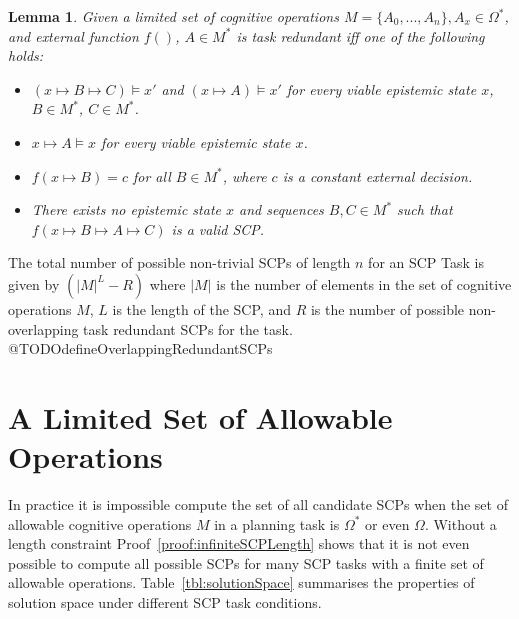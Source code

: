 \documentclass[
11pt, %
english, %
singlespacing, %
headsepline, %
]{MastersDoctoralThesis} %
\newtheorem{lemma}{Lemma}
\begin{document}
\begin{lemma} \label{lem:taskredundant}
Given a limited set of cognitive operations $M=\{A_0, ..., A_n\}, A_x \in \Omega^*$, and external function $f()$, $A \in M^*$ is task redundant iff one of the following holds:
\begin{itemize}
\item $(x \longmapsto B \longmapsto C) \models x'$ and $(x \longmapsto A) \models x'$ for every viable epistemic state $x$, $B \in M^*$, $C \in M^*$. 
\item $x \longmapsto A \models x$ for every viable epistemic state $x$.
\item $f(x \longmapsto B)=c$ for all $B \in M^*$, where $c$ is a constant external decision.
\item There exists no epistemic state $x$ and sequences $B, C \in M^*$ such that $f(x \longmapsto B \longmapsto A \longmapsto C)$ is a valid SCP.
\end{itemize}
\end{lemma}

The total number of possible non-trivial SCPs of length $n$ for an SCP Task is given by $(|M|^L - R)$ where $|M|$ is the number of elements in the set of cognitive operations $M$, $L$ is the length of the SCP, and $R$ is the number of possible non-overlapping task redundant SCPs for the task. @TODOdefineOverlappingRedundantSCPs


\section{A Limited Set of Allowable Operations}
In practice it is impossible compute the set of all candidate SCPs when the set of allowable cognitive operations $M$ in a planning task is $\Omega^*$ or even $\Omega$. Without a length constraint Proof~\ref{proof:infiniteSCPLength} shows that it is not even possible to compute all possible SCPs for many SCP tasks with a finite set of allowable operations. Table~\ref{tbl:solutionSpace} summarises the properties of solution space under different SCP task conditions.
\end{document}
